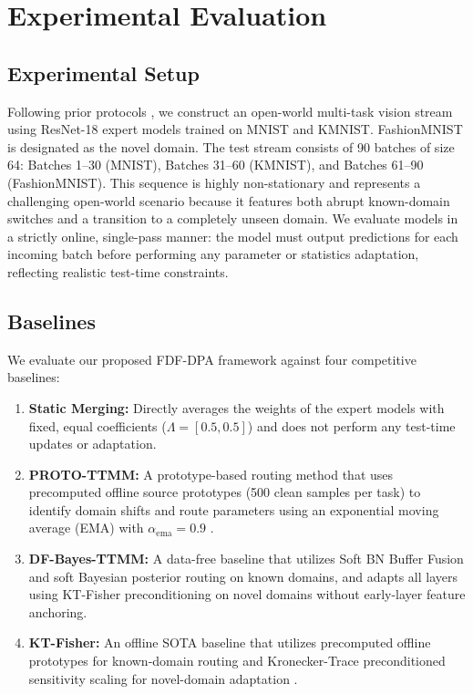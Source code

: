 \documentclass{article}
\theoremstyle{plain}
\theoremstyle{definition}
\theoremstyle{remark}
\begin{document}
\section{Experimental Evaluation}
\label{sec:experiments}

\subsection{Experimental Setup}
Following prior protocols \cite{submission9}, we construct an open-world multi-task vision stream using ResNet-18 expert models trained on MNIST and KMNIST. FashionMNIST is designated as the novel domain. The test stream consists of 90 batches of size 64: Batches 1--30 (MNIST), Batches 31--60 (KMNIST), and Batches 61--90 (FashionMNIST). This sequence is highly non-stationary and represents a challenging open-world scenario because it features both abrupt known-domain switches and a transition to a completely unseen domain. We evaluate models in a strictly online, single-pass manner: the model must output predictions for each incoming batch before performing any parameter or statistics adaptation, reflecting realistic test-time constraints.

\subsection{Baselines}
We evaluate our proposed FDF-DPA framework against four competitive baselines:
\begin{enumerate}
    \item \textbf{Static Merging:} Directly averages the weights of the expert models with fixed, equal coefficients ($\Lambda = [0.5, 0.5]$) and does not perform any test-time updates or adaptation.
    \item \textbf{PROTO-TTMM:} A prototype-based routing method that uses precomputed offline source prototypes (500 clean samples per task) to identify domain shifts and route parameters using an exponential moving average (EMA) with $\alpha_{\text{ema}} = 0.9$ \cite{Yang2024}.
    \item \textbf{DF-Bayes-TTMM:} A data-free baseline that utilizes Soft BN Buffer Fusion and soft Bayesian posterior routing on known domains, and adapts all layers using KT-Fisher preconditioning on novel domains without early-layer feature anchoring.
    \item \textbf{KT-Fisher:} An offline SOTA baseline that utilizes precomputed offline prototypes for known-domain routing and Kronecker-Trace preconditioned sensitivity scaling for novel-domain adaptation \cite{submission9}.
\end{enumerate}
\end{document}
